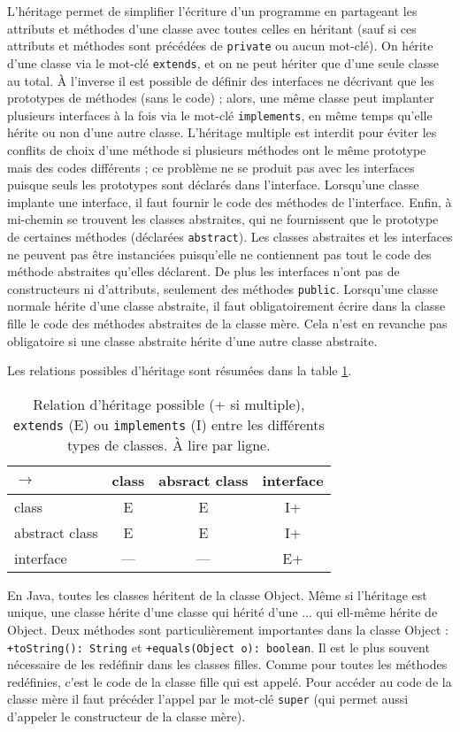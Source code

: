 \documentclass[10pt]{article}
\begin{document}
L'héritage permet de simplifier l'écriture d'un programme en partageant les attributs et méthodes d'une classe
avec toutes celles en héritant (sauf si ces attributs et méthodes sont précédées de \texttt{private} ou aucun mot-clé). 
On hérite d'une classe via le mot-clé \texttt{extends}, et on ne peut hériter que d'une seule classe au total.
À l'inverse il est possible de définir des interfaces ne décrivant que les prototypes de méthodes (sans le code) ;
alors, une même classe peut implanter plusieurs interfaces à la fois via le mot-clé \texttt{implements}, en même temps
qu'elle hérite ou non d'une autre classe. L'héritage multiple est interdit pour éviter les conflits de choix
d'une méthode si plusieurs méthodes ont le même prototype mais des codes différents ; ce problème ne se produit pas avec
les interfaces puisque seuls les prototypes sont déclarés dans l'interface. Lorsqu'une classe implante une interface,
il faut fournir le code des méthodes de l'interface. Enfin, à mi-chemin se trouvent les classes abstraites,
qui ne fournissent que le prototype de certaines méthodes (déclarées \texttt{abstract}). Les classes abstraites
et les interfaces ne peuvent pas être instanciées puisqu'elle ne contiennent pas tout le code des méthode abstraites
qu'elles déclarent. De plus les interfaces n'ont pas de constructeurs ni d'attributs, seulement des méthodes \texttt{public}.
Lorsqu'une classe normale hérite d'une classe abstraite, il faut obligatoirement écrire dans la classe fille
le code des méthodes abstraites de la classe mère. Cela n'est en revanche pas obligatoire si une classe abstraite hérite d'une autre classe abstraite.


Les relations possibles d'héritage sont résumées dans la table \ref{tab.heritage}.
\begin{table}[h!]
  \centering
\begin{tabular}{|l|c|c|c|}
  \hline
  $\longrightarrow$ & class & absract class & interface\\
  \hline
  class & E & E & I+\\
  \hline
  abstract class & E & E & I+ \\
  \hline
  interface & --- & --- & E+ \\
  \hline  
\end{tabular}
\caption{Relation d'héritage possible (+ si multiple), \texttt{extends} (E) ou \texttt{implements} (I) entre les différents types de classes. À lire par ligne.
   \label{tab.heritage}}
\end{table}

En Java, toutes les classes héritent de la classe Object. Même si l'héritage est unique, une classe hérite d'une classe qui hérité d'une ...  qui ell-même hérite de Object.
Deux méthodes sont particulièrement importantes dans la classe Object : \texttt{+toString(): String} et \texttt{+equals(Object o): boolean}. Il est le plus souvent nécessaire
de les redéfinir dans les classes filles. Comme pour toutes les méthodes redéfinies, c'est le code de la classe fille qui est appelé. Pour accéder au code de la classe
mère il faut précéder l'appel par le mot-clé \texttt{super} (qui permet aussi d'appeler le constructeur de la classe mère).
\end{document}
